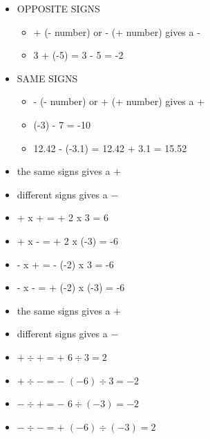 \begin{frame}
\begin{itemize}
\item OPPOSITE SIGNS
\begin{itemize}
\item + (- number) or - (+ number) gives a -
\item 3 + (-5) = 3 - 5  = -2
\end{itemize}
\item SAME SIGNS
\begin{itemize}
\item - (- number) or + (+ number) gives a +
\item (-3) - 7 = -10
\item 12.42 - (-3.1) = 12.42 + 3.1 = 15.52
\end{itemize}
\end{itemize}
\end{frame}
\begin{frame}
\begin{itemize}

	\item the same signs gives a $+$
	\item different signs gives a $-$
	  \vspace*{.35cm}
	\item + x + = +   2 x 3 = 6
	\item + x - = +   2 x (-3) = -6
	\item - x + = -   (-2) x 3 = -6
	\item - x - = +   (-2) x (-3) = -6
\end{itemize}
\end{frame}
\begin{frame}
\begin{itemize}

	\item the same signs gives a $+$
	\item different signs gives a $-$
	  \vspace*{.35cm}
	\item $+ \div  + = +$   $6 \div 3 = 2$
	\item $+ \div  - = -$   $(-6) \div 3 = -2$
	\item $- \div  + = -$   $6 \div (-3) = -2$
	\item $- \div  - = +$   $(-6) \div (-3) = 2$
\end{itemize}
\end{frame}
